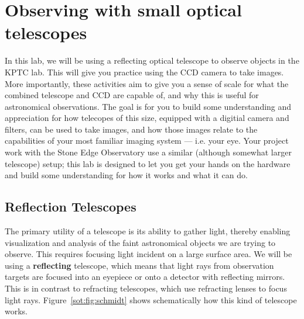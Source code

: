 \chapter{Observing with small optical telescopes}

In this lab, we will be using a reflecting optical telescope to observe objects in the KPTC
lab. This will give you practice using the CCD camera to take images. More importantly,
these activities aim to give you a sense of scale for what the combined telescope and CCD are
capable of, and why this is useful for astronomical observations. The goal is for you to build some
understanding and appreciation for how telecopes of this size, equipped with a digitial camera and
filters, can be used to take images, and how those images relate to the capabilities of your most
familiar imaging system --- i.e. your eye.
Your project work with the Stone Edge Observatory use a similar (although somewhat larger telescope) setup; this lab is designed to let you
get your hands on the hardware and build some understanding for how it works and what it can
do.

\section{Reflection Telescopes}

The primary utility of a telescope is its ability to gather light, thereby enabling visualization and analysis of the faint astronomical objects we are trying to observe. This requires focusing light incident on a large surface area. We will be using a \textbf{reflecting} telescope, which means that light rays from observation targets are focused into an eyepiece or onto a detector with reflecting mirrors. This is in contrast to refracting telescopes, which use refracting lenses to focus light rays. Figure~\ref{sot:fig:schmidt} shows schematically how this kind of telescope works. 

